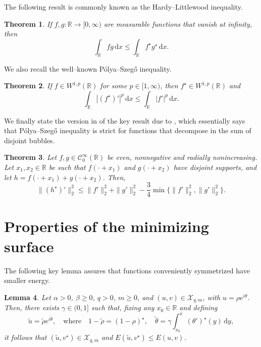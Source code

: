 \documentclass[11pt]{article}
\newcommand{\R}{\mathbb{R}}
\newcommand{\boC}{\mathcal{C}}
\newcommand{\boX}{\mathcal{X}}
\renewcommand{\d}{\,\mathrm{d}}
\theoremstyle{plain}
\newtheorem{theorem}{Theorem}[section]
\newtheorem{lemma}[theorem]{Lemma}
\theoremstyle{definition}
\theoremstyle{remark}
\numberwithin{equation}{section}
\begin{document}
{The following result is commonly known as the Hardy--Littlewood inequality.

\begin{theorem}\label{thm:HardyLittlewood}
    If $f,g:\R\to [0,\infty)$ are measurable functions that vanish at infinity, then
    \[\int_\R fg\d x\leq \int_\R f^\star g^\star\d x.\]
\end{theorem}

We also recall the well--known P\'olya--Szeg\H{o} inequality.

\begin{theorem}\label{thm:PolyaSzego}
If $f\in W^{1,p}(\R)$ for some $p\in [1,\infty)$, then $f^\star\in W^{1,p}(\R)$ and
\[\int_\R|(f^\star)'|^p \d x\leq \int_\R|f'|^p \d x.\]
\end{theorem}

We finally state the version in \cite{Albert_Bhattarai} of the key result due to \cite{Garrisi}, which essentially says that P\'olya--Szeg\H{o} inequality is strict for functions that decompose in the sum of disjoint bubbles. 

\begin{theorem}\label{thm:key}
    Let $f,g\in \boC_0^\infty(\R)$ be even, nonnegative and radially nonincreasing. Let $x_1,x_2\in\R$ be such that $f(\cdot+x_1)$ and $g(\cdot+x_2)$ have disjoint supports, and let $h=f(\cdot+x_1)+g(\cdot+x_2)$. Then,
    \[\|(h^\star)'\|^2_2\leq \|f'\|^2_2 +\|g'\|^2_2 - \frac34\min\{\|f'\|^2_2,\|g'\|^2_2\}.\]
\end{theorem}


\section{Properties of the minimizing surface}\label{sec:properties}


The following key lemma assures that functions conveniently symmetrized have smaller energy.

\begin{lemma}\label{lemma:Adecreases}
    Let $\alpha>0$, $\beta\geq 0$, $q>0$, $m\geq 0$, and $(u,v)\in \boX_{q,m}$, with $u=\rho e^{i\theta}$. Then, there exists $\gamma\in (0,1]$ such that, fixing any $x_0\in\R$ and defining
    \[\tilde u=\tilde\rho e^{i\tilde\theta},\quad\text{where}\quad 1-\tilde\rho=(1-\rho)^\star,\quad \tilde\theta=\gamma\int_{x_0}^x (\theta')^\star(y) \d y,\]
    it follows that $(\tilde u,v^\star)\in \boX_{q,m}$ and $E(\tilde u,v^\star)\leq E(u,v)$.
\end{lemma}



}
\end{document}
